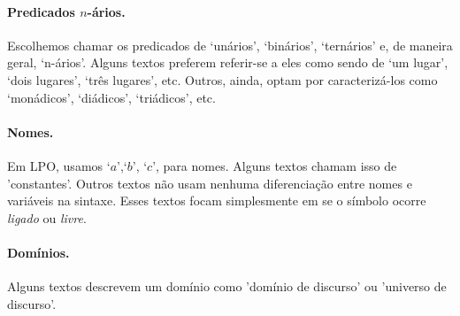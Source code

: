 \paragraph{Predicados $n$-ários.} Escolhemos chamar os predicados de `unários', `binários', `ternários' e, de maneira geral, `n-ários'. Alguns textos preferem referir-se a eles como sendo de `um lugar', `dois lugares', `três lugares', etc. Outros, ainda, optam por caracterizá-los como `monádicos', `diádicos', `triádicos', etc.

\paragraph{Nomes.} Em LPO, usamos `$a$',`$b$', `$c$', para nomes. Alguns textos chamam isso de 'constantes'. Outros textos não usam nenhuma diferenciação entre nomes e variáveis na sintaxe. Esses textos focam simplesmente em se o símbolo ocorre \emph{ligado} ou \emph{livre}.

\paragraph{Domínios.} Alguns textos descrevem um domínio como 'domínio de discurso' ou 'universo de discurso'.

